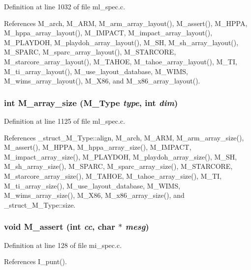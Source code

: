 Definition at line 1032 of file ml\_\-spec.c.

References M\_\-arch, M\_\-ARM, M\_\-arm\_\-array\_\-layout(), M\_\-assert(), M\_\-HPPA, M\_\-hppa\_\-array\_\-layout(), M\_\-IMPACT, M\_\-impact\_\-array\_\-layout(), M\_\-PLAYDOH, M\_\-playdoh\_\-array\_\-layout(), M\_\-SH, M\_\-sh\_\-array\_\-layout(), M\_\-SPARC, M\_\-sparc\_\-array\_\-layout(), M\_\-STARCORE, M\_\-starcore\_\-array\_\-layout(), M\_\-TAHOE, M\_\-tahoe\_\-array\_\-layout(), M\_\-TI, M\_\-ti\_\-array\_\-layout(), M\_\-use\_\-layout\_\-database, M\_\-WIMS, M\_\-wims\_\-array\_\-layout(), M\_\-X86, and M\_\-x86\_\-array\_\-layout().
\subsubsection{\setlength{\rightskip}{0pt plus 5cm}int M\_\-array\_\-size (\bf{M\_\-Type} {\em type}, int {\em dim})}\label{m__spec_8h_eba35106a4ffb0e4d2120838e4e5a41f}




Definition at line 1125 of file ml\_\-spec.c.

References \_\-struct\_\-M\_\-Type::align, M\_\-arch, M\_\-ARM, M\_\-arm\_\-array\_\-size(), M\_\-assert(), M\_\-HPPA, M\_\-hppa\_\-array\_\-size(), M\_\-IMPACT, M\_\-impact\_\-array\_\-size(), M\_\-PLAYDOH, M\_\-playdoh\_\-array\_\-size(), M\_\-SH, M\_\-sh\_\-array\_\-size(), M\_\-SPARC, M\_\-sparc\_\-array\_\-size(), M\_\-STARCORE, M\_\-starcore\_\-array\_\-size(), M\_\-TAHOE, M\_\-tahoe\_\-array\_\-size(), M\_\-TI, M\_\-ti\_\-array\_\-size(), M\_\-use\_\-layout\_\-database, M\_\-WIMS, M\_\-wims\_\-array\_\-size(), M\_\-X86, M\_\-x86\_\-array\_\-size(), and \_\-struct\_\-M\_\-Type::size.
\subsubsection{\setlength{\rightskip}{0pt plus 5cm}void M\_\-assert (int {\em cc}, char $\ast$ {\em mesg})}\label{m__spec_8h_0d060bd976a60ed896a914b0cb1d1601}




Definition at line 128 of file mi\_\-spec.c.

References I\_\-punt().

